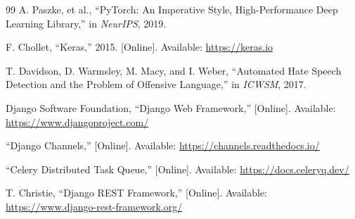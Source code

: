 \documentclass[conference]{IEEEtran}
\begin{document}
\begin{thebibliography}{99}
A. Paszke, et al., ``PyTorch: An Imperative Style, High-Performance Deep Learning Library,'' in \emph{NeurIPS}, 2019.

F. Chollet, ``Keras,'' 2015. [Online]. Available: \url{https://keras.io}

T. Davidson, D. Warmsley, M. Macy, and I. Weber, ``Automated Hate Speech Detection and the Problem of Offensive Language,'' in \emph{ICWSM}, 2017.

Django Software Foundation, ``Django Web Framework,'' [Online]. Available: \url{https://www.djangoproject.com/}

``Django Channels,'' [Online]. Available: \url{https://channels.readthedocs.io/}

``Celery Distributed Task Queue,'' [Online]. Available: \url{https://docs.celeryq.dev/}

T. Christie, ``Django REST Framework,'' [Online]. Available: \url{https://www.django-rest-framework.org/}
\end{thebibliography}

\end{document}
